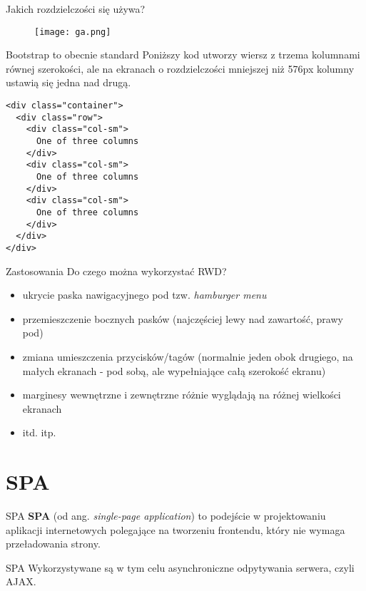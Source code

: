 \begin{frame}{Jakich rozdzielczości się używa?}
	\begin{figure}[t]
		\centering
		\texttt{[image: ga.png]}
	\end{figure}
\end{frame}

\begin{frame}[fragile]{Bootstrap to obecnie standard}
	Poniższy kod utworzy wiersz z trzema kolumnami równej szerokości, ale na ekranach o rozdzielczości mniejszej niż 576px kolumny ustawią się jedna nad drugą.

	\begin{lstlisting}
<div class="container">
  <div class="row">
    <div class="col-sm">
      One of three columns
    </div>
    <div class="col-sm">
      One of three columns
    </div>
    <div class="col-sm">
      One of three columns
    </div>
  </div>
</div>
	\end{lstlisting}
\end{frame}

\begin{frame}{Zastosowania}	
	Do czego można wykorzystać RWD?
	\begin{itemize}
	\item ukrycie paska nawigacyjnego pod tzw. \emph{hamburger menu}
	\item przemieszczenie bocznych pasków (najczęściej lewy nad zawartość, prawy pod)
	\item zmiana umieszczenia przycisków/tagów (normalnie jeden obok drugiego, na małych ekranach - pod sobą, ale wypełniające całą szerokość ekranu)
	\item marginesy wewnętrzne i zewnętrzne różnie wyglądają na różnej wielkości ekranach
	\item itd. itp.
	\end{itemize}
\end{frame}

\section{SPA}

\begin{frame}{SPA}	
	\textbf{SPA} (od ang. \emph{single-page application}) to podejście w projektowaniu aplikacji internetowych polegające na tworzeniu frontendu, który nie wymaga przeładowania strony.
\end{frame}

\begin{frame}{SPA}	
	Wykorzystywane są w tym celu asynchroniczne odpytywania serwera, czyli AJAX.
\end{frame}

